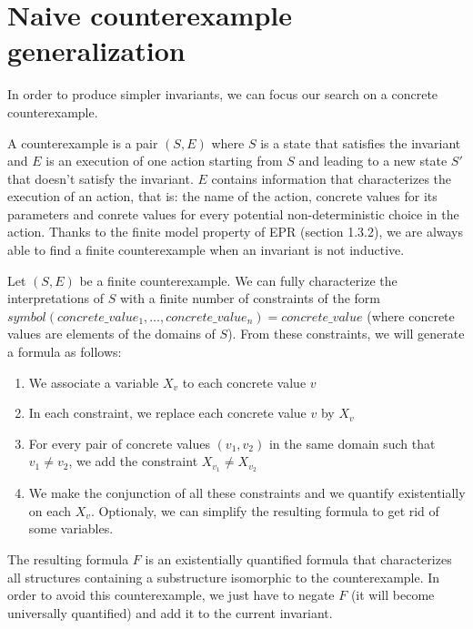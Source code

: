 \documentclass[11pt,a4paper,oldfontcommands,openany]{memoir}
\begin{document}
    \section{Naive counterexample generalization}

    In order to produce simpler invariants, we can focus our search on a concrete counterexample.

    A counterexample is a pair \( (S,E) \) where \(S\) is a state that satisfies the invariant and \(E\) is an execution of one action starting from \(S\)
    and leading to a new state \(S'\) that doesn't satisfy the invariant. \(E\) contains information that characterizes the execution of an action, that is:
    the name of the action, concrete values for its parameters and conrete values for every potential non-deterministic choice in the action.
    Thanks to the finite model property of EPR (section 1.3.2), we are always able to find a finite counterexample when an invariant is not inductive.
    
    Let \( (S,E) \) be a finite counterexample.
    We can fully characterize the interpretations of \(S\) with a finite number of constraints of the form \(symbol(concrete\_value_1,\ldots,concrete\_value_n) = concrete\_value\)
    (where concrete values are elements of the domains of \(S\)).
    From these constraints, we will generate a formula as follows:
    \begin{enumerate}
        \item We associate a variable \( X_v \) to each concrete value \(v\)
        \item In each constraint, we replace each concrete value \(v\) by \( X_v \)
        \item For every pair of concrete values \( (v_1,v_2) \) in the same domain such that \( v_1 \neq v_2 \), we add the constraint \( X_{v_1} \neq X_{v_2} \)
        \item We make the conjunction of all these constraints and we quantify existentially on each \(X_v\). Optionaly, we can simplify the resulting formula to get rid of some variables.
    \end{enumerate}
    
    The resulting formula \(F\) is an existentially quantified formula that characterizes all structures containing a substructure isomorphic to the counterexample.
    In order to avoid this counterexample, we just have to negate \(F\) (it will become universally quantified) and add it to the current invariant.
\end{document}
